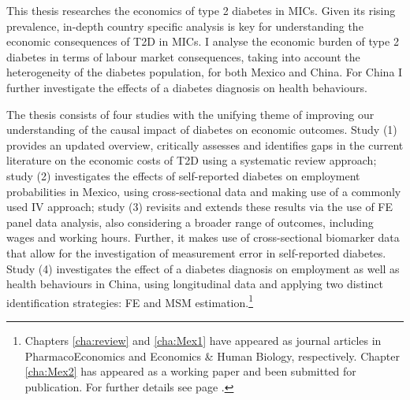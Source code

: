 This thesis researches the economics of type 2 diabetes in \acfp{MIC}. Given its rising prevalence, in-depth country specific analysis is key for understanding the economic consequences of T2D in \acp{MIC}. I analyse the economic burden of type 2 diabetes in terms of labour market consequences, taking into account the heterogeneity of the diabetes population, for both Mexico and China. For China I further investigate the effects of a diabetes diagnosis on health behaviours.

The thesis consists of four studies with the unifying theme of improving our understanding of the causal impact of diabetes on  economic outcomes. Study (1) provides an updated overview, critically assesses and identifies gaps in the current literature on the economic costs of T2D using a systematic review approach; study (2) investigates the effects of self-reported diabetes on employment probabilities in Mexico, using cross-sectional data and making use of a commonly used \acf{IV} approach; study (3) revisits and extends these results via the use of \ac{FE} panel data analysis, also considering a broader range of outcomes, including wages and working hours. Further, it makes use of cross-sectional biomarker data that allow for the investigation of measurement error in self-reported diabetes. Study (4) investigates the effect of a diabetes diagnosis on employment as well as health behaviours in China, using longitudinal data and applying two distinct identification strategies: \ac{FE} and \acf{MSM} estimation.\footnote{Chapters \ref{cha:review} and \ref{cha:Mex1} have appeared as journal articles in PharmacoEconomics and Economics \& Human Biology, respectively. Chapter \ref{cha:Mex2} has appeared as a working paper and been submitted for publication. For further details see page \pageref{sec:publications}.}

